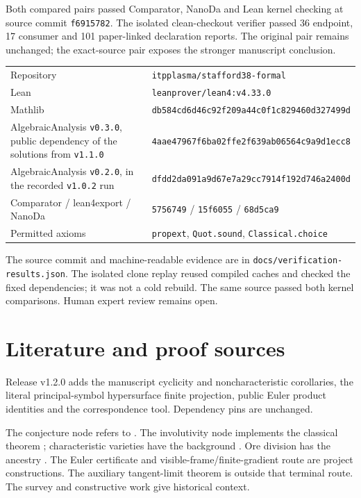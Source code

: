 \documentclass[11pt,a4paper]{article}
\theoremstyle{definition}
\theoremstyle{plain}
\newcommand{\lean}[1]{\texttt{#1}}
\begin{document}
Both compared pairs passed Comparator, NanoDa and Lean kernel checking at
source commit \lean{f6915782}. The isolated clean-checkout verifier passed
36 endpoint, 17 consumer and 101 paper-linked declaration reports. The original pair remains unchanged;
the exact-source pair exposes the stronger manuscript conclusion.

\begin{center}
\begin{tabular}{@{}p{5.2cm}l@{}}
\toprule
Repository & \lean{itpplasma/stafford38-formal} \\
Lean & \lean{leanprover/lean4:v4.33.0} \\
Mathlib & \lean{db584cd6d46c92f209a44c0f1c829460d327499d} \\
AlgebraicAnalysis \lean{v0.3.0}, public dependency of the solutions from \lean{v1.1.0} & \lean{4aae47967f6ba02ffe2f639ab06564c9a9d1ecc8} \\
AlgebraicAnalysis \lean{v0.2.0}, in the recorded \lean{v1.0.2} run & \lean{dfdd2da091a9d67e7a29cc7914f192d746a2400d} \\
Comparator / lean4export / NanoDa & \lean{5756749} / \lean{15f6055} / \lean{68d5ca9} \\
Permitted axioms & \lean{propext}, \lean{Quot.sound}, \lean{Classical.choice} \\
\bottomrule
\end{tabular}
\end{center}

\begin{sloppypar}
The source commit and machine-readable evidence are in
\lean{docs/verification-results.json}. The isolated clone replay reused
compiled caches and checked the fixed dependencies; it was not a cold rebuild.
The same source passed both kernel comparisons. Human expert review remains open.
\end{sloppypar}

\section{Literature and proof sources}\label{sec:literature}
Release v1.2.0 adds the manuscript cyclicity and noncharacteristic corollaries,
the literal principal-symbol hypersurface finite projection, public Euler
product identities and the correspondence tool. Dependency pins are unchanged.

The conjecture node refers to \cite{Sta78}. The involutivity node implements
the classical theorem \cite{Gab81}; characteristic varieties have the background
\cite{HTT08}. Ore division has the ancestry \cite{Ore33}. The Euler certificate
and visible-frame/finite-gradient route are project constructions. The
auxiliary tangent-limit theorem is outside that terminal route. The survey
\cite{Bel26} and constructive work \cite{Ley04} give historical context.
\end{document}
